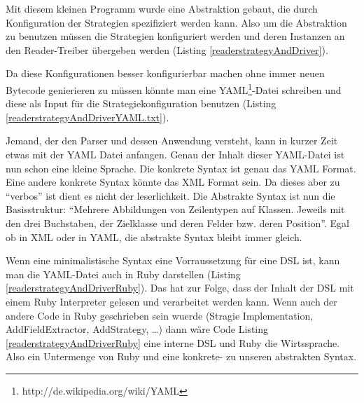 \documentclass[11pt,english,ngerman, headsepline]{scrreprt}
\begin{document}
Mit diesem kleinen Programm wurde eine Abstraktion gebaut, die durch
Konfiguration der Strategien spezifiziert werden kann.
Also um die Abstraktion zu benutzen müssen die Strategien konfiguriert werden
und deren Instanzen an den Reader-Treiber übergeben werden  (Listing
\ref{readerstrategyAndDriver}).
 



Da diese Konfigurationen besser konfigurierbar machen ohne immer neuen Bytecode
genierieren zu müssen könnte man eine
YAML\footnote{http://de.wikipedia.org/wiki/YAML}-Datei schreiben und diese als
Input für die Strategiekonfiguration benutzen  (Listing
\ref{readerstrategyAndDriverYAML.txt}).
 


Jemand, der den Parser und dessen Anwendung versteht, kann in kurzer Zeit etwas
mit der YAML Datei anfangen. Genau der Inhalt dieser YAML-Datei ist nun schon
eine kleine Sprache. Die konkrete Syntax ist genau das YAML Format. Eine andere
konkrete Syntax könnte das XML Format sein. Da dieses aber zu ``verbos'' ist
dient es nicht der leserlichkeit. Die Abstrakte Syntax ist nun die
Basisstruktur: ``Mehrere Abbildungen von Zeilentypen auf Klassen. Jeweils mit
den drei Buchstaben, der Zielklasse und deren Felder bzw. deren Position''.
Egal ob in XML oder in YAML, die abstrakte Syntax bleibt immer gleich.

Wenn eine minimalistische Syntax eine Vorraussetzung für eine DSL ist, kann man
die YAML-Datei auch in Ruby darstellen (Listing
\ref{readerstrategyAndDriverRuby}). Das hat zur Folge, dass der Inhalt der DSL
mit einem Ruby Interpreter gelesen und verarbeitet werden kann. Wenn auch der andere Code in Ruby geschrieben sein wuerde (Stragie
Implementation, AddFieldExtractor, AddStrategy, \ldots) dann wäre Code Listing
\ref{readerstrategyAndDriverRuby} eine interne DSL und Ruby die Wirtssprache.
Also ein Untermenge von Ruby und eine konkrete- zu unseren abstrakten
Syntax.




\end{document}
